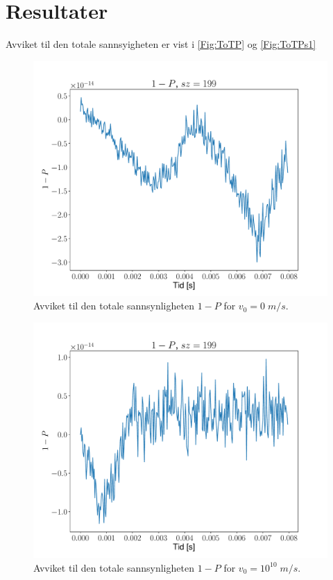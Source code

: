 \documentclass[reprint,english,notitlepage]{revtex4-2}  %
\begin{document}
\section{Resultater}

Avviket til den totale sannsyigheten er vist i \autoref{Fig:ToTP} og \autoref{Fig:ToTPs1}

\begin{figure}
\centering
\includegraphics[scale=0.4, trim={2cm 0 0 0}]{../Images/7P199.pdf}
\caption{Avviket til den totale sannsynligheten $1 - P$ for $v_0 = 0 \; m/s$.}
\label{Fig:ToTP}
\end{figure}

\begin{figure}
\centering
\includegraphics[scale=0.4, trim={2cm 0 0 0}]{../Images/7s1P199.pdf}
\caption{Avviket til den totale sannsynligheten $1 - P$ for $v_0 = 10^10 \; m/s$.}
\label{Fig:ToTPs1}
\end{figure}
\end{document}
